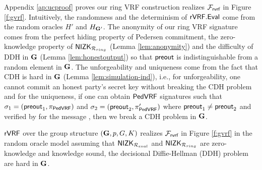



Appendix \ref{ap:ucproof} proves our ring VRF construction realizes $ \mathcal{F}_{\textsf{rvrf}} $ in Figure \ref{f:gvrf}. Intuitively, the randomness and the determinism of $ {\mathsf{rVRF}}.{\mathsf{Eval}} $ come from the random oracles $ H' $ and $ H_{{\mathbf{G}}'} $.  The anonymity of our ring VRF signature comes from the perfect hiding property of Pedersen commitment, the zero-knowledge property of $ {\mathsf{NIZK}}_{\mathcal{R}_{ring}} $ (Lemma \ref{lem:anonymity}) and the difficulty of DDH in  $ {\mathbf{G}} $ (Lemma \ref{lem:honestoutput}) so that $ {\mathsf{preout}} $ is indistinguishable from a random element in $ {\mathbf{G}} $. The unforgeability and uniqueness come from the fact that CDH is hard in $ {\mathbf{G}} $ (Lemma \ref{lem:simulation-ind}), i.e., for unforgeability,  one cannot commit an honest party's secret key without breaking the CDH problem and for the uniqueness,  if one can obtain $ {\mathsf{PedVRF}} $ signatures such that $ \sigma_1 = ({\mathsf{preout}}_1, \pi_{{\mathsf{PedVRF}}}) $ and $ \sigma_2 = ({\mathsf{preout}}_2, \pi'_{{\mathsf{PedVRF}}}) $ where  $ {\mathsf{preout}}_1 \neq {\ensuremath{\mathsf{preout}}}_2 $  and verified by \compk for the message \msg, then we break a CDH problem in $ {\mathbf{G}} $.

\begin{theorem}\label{thm:rvrfmain}
$ {\mathsf{rVRF}} $  over the group structure $ ({\mathbf{G}},p,G,K) $ realizes $ \mathcal{F}_{\textsf{rvrf}} $ in Figure \ref{f:gvrf} in the random oracle model assuming that $ {\mathsf{NIZK}}_{\mathcal{R}_{eval}} $ and $ {\mathsf{NIZK}}_{\mathcal{R}_{ring}}$ are zero-knowledge and knowledge sound, the decisional Diffie-Hellman (DDH) problem are hard in $ {\mathbf{G}}  $. 
\end{theorem}




\endinput

